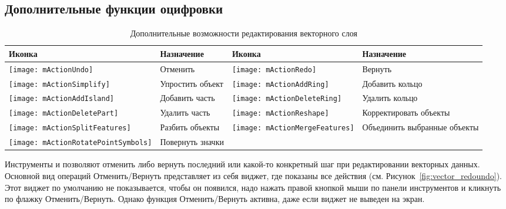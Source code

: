 \subsection{Дополнительные функции оцифровки}
\label{sec:advanced_edit}

\begin{table}[h]
\centering
\small
\begin{tabular}{|l|p{6.9cm}|l|p{6.9cm}|}
\hline \textbf{Иконка} & \textbf{Назначение} & \textbf{Иконка} & \textbf{Назначение} \\
\hline \texttt{[image: mActionUndo]}
   & Отменить
   & \texttt{[image: mActionRedo]}
   & Вернуть \\
\hline \texttt{[image: mActionSimplify]}
   & Упростить объект
   & \texttt{[image: mActionAddRing]}
   & Добавить кольцо \\
\hline \texttt{[image: mActionAddIsland]}
   & Добавить часть
   & \texttt{[image: mActionDeleteRing]}
   & Удалить кольцо \\
\hline \texttt{[image: mActionDeletePart]}
   & Удалить часть
   & \texttt{[image: mActionReshape]}
   & Корректировать объекты \\
\hline \texttt{[image: mActionSplitFeatures]}
   & Разбить объекты
   & \texttt{[image: mActionMergeFeatures]}
   & Объединить выбранные объекты \\
\hline \texttt{[image: mActionRotatePointSymbols]}
   & Повернуть значки
   &
   & \\
\hline
\end{tabular}
\caption{Дополнительные возможности редактирования векторного слоя}\label{tab:advanced_editing}
\end{table}


Инструменты  и
 позволяют отменить либо вернуть
последний или какой-то конкретный шаг при редактировании векторных данных.
Основной вид операций Отменить/Вернуть представляет из себя виджет, где
показаны все действия (см. Рисунок~\ref{fig:vector_redoundo}). Этот виджет
по умолчанию не показывается, чтобы он появился, надо нажать правой кнопкой
мыши по панели инструментов и кликнуть по флажку Отменить/Вернуть. Однако
функция Отменить/Вернуть активна, даже если виджет не выведен на экран.

